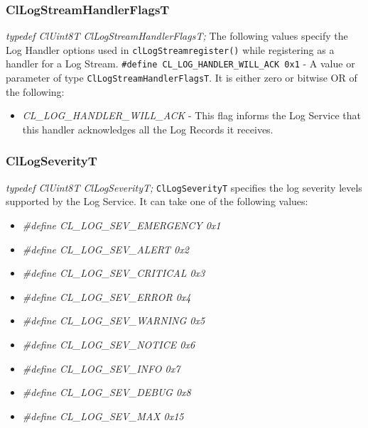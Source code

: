 \begin{flushleft}
\subsubsection{ClLogStreamHandlerFlagsT}
\textit{typedef ClUint8T ClLogStreamHandlerFlagsT;}
\newline
\newline
The following values specify the Log Handler options used in {\tt{clLogStreamregister()}} while registering as a handler for a Log Stream.
{\tt{\#define CL\_\-LOG\_\-HANDLER\_\-WILL\_\-ACK 0x1}} - A value or parameter of type {\tt{ClLogStreamHandlerFlagsT}}. It is either zero or bitwise 
OR of the following: 
\begin{itemize}
\item
\textit{CL\_\-LOG\_\-HANDLER\_\-WILL\_\-ACK} - This flag informs the Log Service that this handler acknowledges all the Log Records it receives.
\end{itemize}




\subsubsection{ClLogSeverityT}
\textit{typedef ClUint8T ClLogSeverityT;}
\newline
\newline
{\tt{ClLogSeverityT}} specifies the log severity levels supported by the Log Service. It can take one of the following values:
\begin{itemize}
\item \textit{\#define CL\_\-LOG\_\-SEV\_\-EMERGENCY 0x1}
	\item\textit{\#define CL\_\-LOG\_\-SEV\_\-ALERT 0x2}
	\item\textit{\#define CL\_\-LOG\_\-SEV\_\-CRITICAL 0x3}
	\item\textit{\#define CL\_\-LOG\_\-SEV\_\-ERROR 0x4}
	\item\textit{\#define CL\_\-LOG\_\-SEV\_\-WARNING 0x5}
	\item\textit{\#define CL\_\-LOG\_\-SEV\_\-NOTICE 0x6}
	\item\textit{\#define CL\_\-LOG\_\-SEV\_\-INFO 0x7}
	\item\textit{\#define CL\_\-LOG\_\-SEV\_\-DEBUG 0x8}
	\item\textit{\#define CL\_\-LOG\_\-SEV\_\-MAX 0x15}
\end{itemize}	



\end{flushleft}
